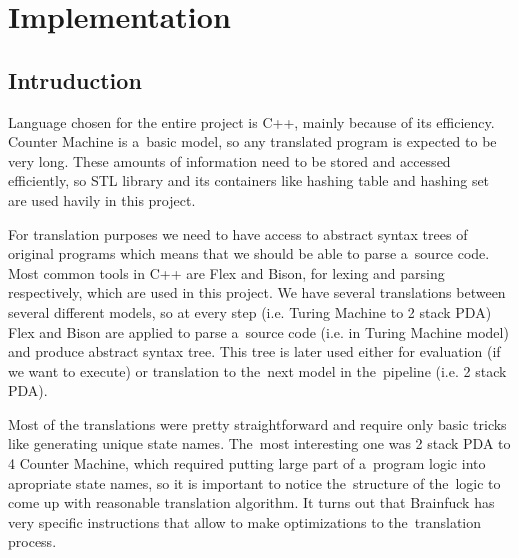 \documentclass[english,shortabstract,mgr]{iithesis}
\begin{document}
\chapter{Implementation}

\section{Intruduction}

Language chosen for the entire project is C++, mainly because of its efficiency. Counter Machine
is a~basic model, so any translated program is expected to be very long. These amounts of information
need to be stored and accessed efficiently, so STL library and its containers like hashing table
and hashing set are used havily in this project.

For translation purposes we need to have access to abstract syntax trees of original programs which
means that we should be able to parse a~source code. Most common tools in C++ are Flex and Bison,
for lexing and parsing respectively, which are used in this project. We have several translations
between several different models, so at every step (i.e. Turing Machine to 2 stack PDA) Flex and Bison
are applied to parse a~source code (i.e. in Turing Machine model) and produce abstract syntax tree.
This tree is later used either for evaluation (if we want to execute) or translation to the~next
model in the~pipeline (i.e. 2 stack PDA).

Most of the translations were pretty straightforward and require only basic tricks like
generating unique state names. The~most interesting one was 2 stack PDA to 4 Counter Machine,
which required putting large part of a~program logic into apropriate state names, so it is important
to notice the~structure of the~logic to come up with reasonable translation algorithm.
It turns out that Brainfuck has very specific instructions that allow to make optimizations
to the~translation process.
\end{document}
